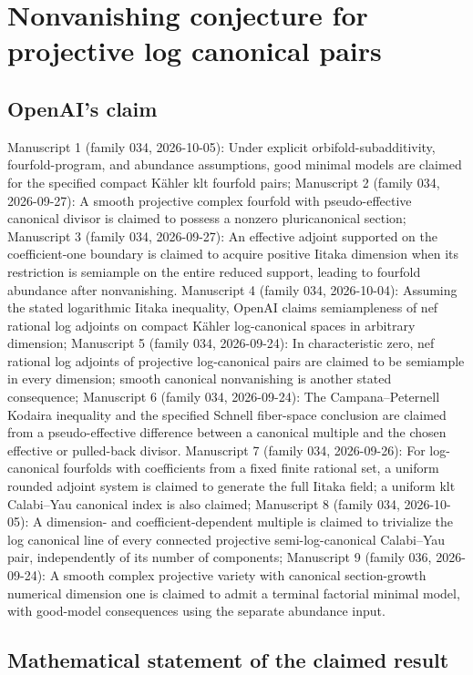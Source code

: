 \documentclass[11pt]{article}
\begin{document}
\section*{Nonvanishing conjecture for projective log canonical pairs}

\subsection{OpenAI's claim}
Manuscript 1 (family 034, 2026-10-05): Under explicit orbifold-subadditivity, fourfold-program, and abundance assumptions, good minimal models are claimed for the specified compact Kähler klt fourfold pairs; Manuscript 2 (family 034, 2026-09-27): A smooth projective complex fourfold with pseudo-effective canonical divisor is claimed to possess a nonzero pluricanonical section; Manuscript 3 (family 034, 2026-09-27): An effective adjoint supported on the coefficient-one boundary is claimed to acquire positive Iitaka dimension when its restriction is semiample on the entire reduced support, leading to fourfold abundance after nonvanishing. Manuscript 4 (family 034, 2026-10-04): Assuming the stated logarithmic Iitaka inequality, OpenAI claims semiampleness of nef rational log adjoints on compact Kähler log-canonical spaces in arbitrary dimension; Manuscript 5 (family 034, 2026-09-24): In characteristic zero, nef rational log adjoints of projective log-canonical pairs are claimed to be semiample in every dimension; smooth canonical nonvanishing is another stated consequence; Manuscript 6 (family 034, 2026-09-24): The Campana--Peternell Kodaira inequality and the specified Schnell fiber-space conclusion are claimed from a pseudo-effective difference between a canonical multiple and the chosen effective or pulled-back divisor. Manuscript 7 (family 034, 2026-09-26): For log-canonical fourfolds with coefficients from a fixed finite rational set, a uniform rounded adjoint system is claimed to generate the full Iitaka field; a uniform klt Calabi--Yau canonical index is also claimed; Manuscript 8 (family 034, 2026-10-05): A dimension- and coefficient-dependent multiple is claimed to trivialize the log canonical line of every connected projective semi-log-canonical Calabi--Yau pair, independently of its number of components; Manuscript 9 (family 036, 2026-09-24): A smooth complex projective variety with canonical section-growth numerical dimension one is claimed to admit a terminal factorial minimal model, with good-model consequences using the separate abundance input.

\subsection{Mathematical statement of the claimed result}
\end{document}
